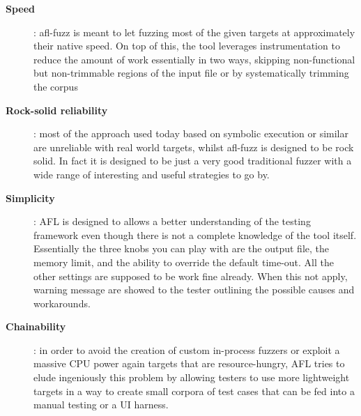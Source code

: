 \begin{description}
    \item[\textbf{Speed}]: afl-fuzz is meant to let fuzzing most of the given targets at approximately their native speed. On top of this, the tool leverages instrumentation
    to reduce the amount of work essentially in two ways, \ie skipping non-functional but non-trimmable regions of the input file or by systematically trimming the corpus 
    \item[\textbf{Rock-solid reliability}]: most of the approach used today based on symbolic execution or similar are unreliable with real world targets, whilst afl-fuzz is
    designed to be rock solid. In fact it is designed to be just a very good traditional fuzzer with a wide range of interesting and useful strategies to go by. 
    \item[\textbf{Simplicity}]: AFL is designed to allows a better understanding of the testing framework even though there is not a complete knowledge of the tool itself.
    Essentially the three knobs you can play with are the output file, the memory limit, and the ability to override the default time-out. All the other settings are supposed to be
    work fine already. When this not apply, warning message are showed to the tester outlining the possible causes and workarounds.
    \item[\textbf{Chainability}]: in order to avoid the creation of custom in-process fuzzers or exploit a massive CPU power again targets that are resource-hungry, AFL tries to
    elude ingeniously this problem by allowing testers to use more lightweight targets in a way to create small corpora of test cases that can be fed into a manual testing or a UI harness.
\end{description}






